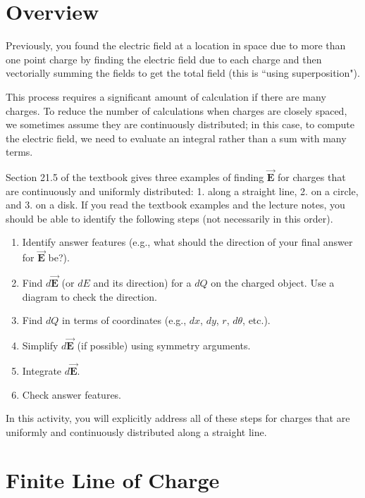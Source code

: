 \documentclass{article}
\newcommand{\bfvec}[1]{\vec{\mathbf{#1}}}
\begin{document}
\section{Overview}

Previously, you found the electric field at a location in space due to more than one point charge by finding the electric field due to each charge and then vectorially summing the fields to get the total field (this is ``using superposition").

This process requires a significant amount of calculation if there are many charges. To reduce the number of calculations when charges are closely spaced, we sometimes assume they are continuously distributed; in this case, to compute the electric field, we need to evaluate an integral rather than a sum with many terms.

Section 21.5 of the textbook gives three examples of finding $\bfvec{E}$ for charges that are continuously and uniformly distributed: 1. along a straight line, 2. on a circle, and 3. on a disk. If you read the textbook examples and the lecture notes, you should be able to identify the following steps (not necessarily in this order).

\begin{enumerate}

  \item Identify answer features (e.g., what should the direction of your final answer for $\bfvec{E}$ be?).

  \item Find $d\bfvec{E}$ (or $dE$ and its direction) for a $dQ$ on the charged object. Use a diagram to check the direction.

  \item Find $dQ$ in terms of coordinates (e.g., $dx$, $dy$, $r$, $d\theta$, etc.).

  \item Simplify $d\bfvec{E}$ (if possible) using symmetry arguments.

  \item Integrate $d\bfvec{E}$.

  \item Check answer features.

\end{enumerate}

In this activity, you will explicitly address all of these steps for charges that are uniformly and continuously distributed along a straight line.

\section{Finite Line of Charge}
\end{document}
